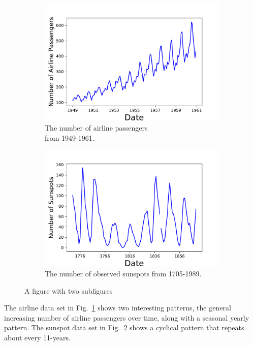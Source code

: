 \documentclass[10pt,a4paper]{article}
\begin{document}
\begin{figure}[h]
\centering
\begin{subfigure}{.5\textwidth}
  \centering
  \includegraphics[scale=0.41]{Airline_Passengers.pdf}
  \caption{The number of airline passengers\\ from 1949-1961.}
  \label{fig:Airline example}
\end{subfigure}%
\begin{subfigure}{.5\textwidth}
  \centering
  \includegraphics[scale=0.41]{Sunspot.pdf}
 \caption{The number of observed sunspots from 1705-1989. }
  \label{fig:Sunspot example}
\end{subfigure}
\caption{A figure with two subfigures}
\label{fig:test}
\end{figure}


The airline data set in Fig.~\ref{fig:Airline example} shows two interesting patterns, the general increasing number of airline passengers over time, along with a seasonal yearly pattern. The sunspot data set in Fig.~\ref{fig:Sunspot example} shows a cyclical pattern that repeats about every 11-years.
\end{document}
